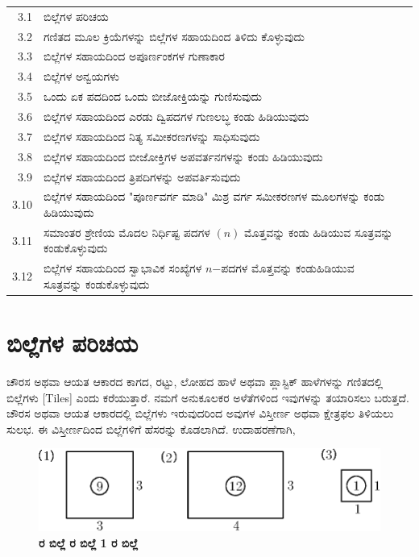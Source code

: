 {\renewcommand{\arraystretch}{1.2}
\begin{longtable}[l]{@{}>{}r>{\raggedright}p{9.1cm}>{}r@{}}
\hline
3.1 & ಬಿಲ್ಲೆಗಳ ಪರಿಚಯ \dotfill & \pageref{sec3.1}\\
3.2 & ಗಣಿತದ ಮೂಲ ಕ್ರಿಯೆಗಳನ್ನು ಬಿಲ್ಲೆಗಳ ಸಹಾಯದಿಂದ ತಿಳಿದು ಕೊಳ್ಳುವುದು \dotfill & \raisebox{-0.55cm}{\pageref{sec3.2}}\\
3.3 & ಬಿಲ್ಲೆಗಳ ಸಹಾಯದಿಂದ ಅಪೂರ್ಣಂಕಗಳ ಗುಣಾಕಾರ \dotfill & \pageref{sec3.3}\\
3.4 & ಬಿಲ್ಲೆಗಳ ಅನ್ವಯಗಳು \dotfill  & \pageref{sec3.4}\\
3.5 & ಒಂದು ಏಕ ಪದದಿಂದ ಒಂದು ಬೀಜೋಕ್ತಿಯನ್ನು ಗುಣಿಸುವುದು \dotfill & \pageref{sec3.5}\\
3.6 & ಬಿಲ್ಲೆಗಳ ಸಹಾಯದಿಂದ ಎರಡು ದ್ವಿಪದಗಳ ಗುಣಲಬ್ಧ ಕಂಡು ಹಿಡಿಯುವುದು  \dotfill & \raisebox{-0.55cm}{\pageref{sec3.6}}\\
3.7 & ಬಿಲ್ಲೆಗಳ ಸಹಾಯದಿಂದ ನಿತ್ಯ ಸಮೀಕರಣಗಳನ್ನು ಸಾಧಿಸುವುದು  \dotfill & \pageref{sec3.7}\\
3.8 & ಬಿಲ್ಲೆಗಳ ಸಹಾಯದಿಂದ ಬೀಜೋಕ್ತಿಗಳ ಅಪವರ್ತನಗಳನ್ನು ಕಂಡು ಹಿಡಿಯುವುದು \dotfill & \raisebox{-0.55cm}{\pageref{sec3.8}}\\
3.9 & ಬಿಲ್ಲೆಗಳ ಸಹಾಯದಿಂದ ತ್ರಿಪದಿಗಳನ್ನು ಅಪವರ್ತಿಸುವುದು \dotfill & \pageref{sec3.9}\\
3.10 & ಬಿಲ್ಲೆಗಳ ಸಹಾಯದಿಂದ "ಪೂರ್ಣವರ್ಗ ಮಾಡಿ" ಮಿಶ್ರ ವರ್ಗ ಸಮೀಕರಣಗಳ ಮೂಲಗಳನ್ನು ಕಂಡು ಹಿಡಿಯುವುದು \dotfill & \raisebox{-0.55cm}{\pageref{sec3.10}}\\
3.11 &  ಸಮಾಂತರ ಶ್ರೇಣಿಯ ಮೊದಲ ನಿರ್ಧಿಷ್ಟ ಪದಗಳ $(n)$ ಮೊತ್ತವನ್ನು ಕಂಡು ಹಿಡಿಯುವ ಸೂತ್ರವನ್ನು ಕಂಡುಕೊಳ್ಳುವುದು \dotfill & \raisebox{-0.55cm}{\pageref{sec3.11}}\\
3.12 & ಬಿಲ್ಲೆಗಳ ಸಹಾಯದಿಂದ ಸ್ವಾಭಾವಿಕ ಸಂಖ್ಯೆಗಳ $n$$-$ಪದಗಳ ಮೊತ್ತವನ್ನು ಕಂಡುಹಿಡಿಯುವ ಸೂತ್ರವನ್ನು ಕಂಡುಕೊಳ್ಳುವುದು \dotfill & \raisebox{-0.55cm}{\pageref{sec3.12}}\\[0.5cm]
\hline
\end{longtable}}\relax

\bigskip

\section{ಬಿಲ್ಲೆಗಳ ಪರಿಚಯ}\label{sec3.1}%

ಚೌರಸ ಅಥವಾ ಆಯತ ಆಕಾರದ ಕಾಗದ, ರಟ್ಟು, ಲೋಹದ ಹಾಳೆ ಅಥವಾ ಪ್ಲಾಸ್ಟಿಕ್ ಹಾಳೆಗಳನ್ನು ಗಣಿತದಲ್ಲಿ ಬಿಲ್ಲೆಗಳು [Tiles] ಎಂದು ಕರೆಯುತ್ತಾರೆ. ನಮಗೆ ಅನುಕೂಲಕರ ಅಳೆತೆಗಳಿಂದ ಇವುಗಳನ್ನು ತಯಾರಿಸಲು ಬರುತ್ತದೆ. ಚೌರಸ ಅಥವಾ ಆಯತ ಆಕಾರದಲ್ಲಿ ಬಿಲ್ಲೆಗಳು ಇರುವುದರಿಂದ ಅವುಗಳ ವಿಸ್ತೀರ್ಣ ಅಥವಾ ಕ್ಷೇತ್ರಫಲ ತಿಳಿಯಲು ಸುಲಭ. ಈ ವಿಸ್ತೀರ್ಣದಿಂದ ಬಿಲ್ಲೆಗಳಿಗೆ ಹೆಸರನ್ನು ಕೊಡಲಾಗಿದೆ. ಉದಾಹರಣೆಗಾಗಿ, 
\begin{figure}[H]
\centering
\includegraphics[scale=0.8]{src/figure/chap3/fig3-1.eps}\\
\textbf{ ರ ಬಿಲ್ಲೆ  \hspace{1.5cm}  ರ ಬಿಲ್ಲೆ \hspace{2cm} 1 ರ ಬಿಲ್ಲೆ }
\end{figure}



